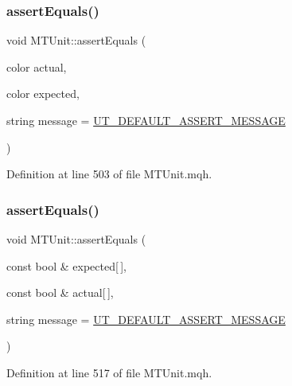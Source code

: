 \subsubsection{\texorpdfstring{assert\+Equals()}{assertEquals()}\hspace{0.1cm}{\footnotesize\ttfamily [14/28]}}
{\footnotesize\ttfamily void M\+T\+Unit\+::assert\+Equals (\begin{DoxyParamCaption}\item[{color}]{actual,  }\item[{color}]{expected,  }\item[{string}]{message = {\ttfamily \mbox{\hyperlink{_m_t_unit_8mqh_a96f5d62188d09039ebc3f443c9120e39}{U\+T\+\_\+\+D\+E\+F\+A\+U\+L\+T\+\_\+\+A\+S\+S\+E\+R\+T\+\_\+\+M\+E\+S\+S\+A\+GE}}} }\end{DoxyParamCaption})}



Definition at line 503 of file M\+T\+Unit.\+mqh.

\mbox{\label{class_m_t_unit_a9986024867ae7bd3dc91498a5adfaca5}} 
\subsubsection{\texorpdfstring{assert\+Equals()}{assertEquals()}\hspace{0.1cm}{\footnotesize\ttfamily [15/28]}}
{\footnotesize\ttfamily void M\+T\+Unit\+::assert\+Equals (\begin{DoxyParamCaption}\item[{const bool \&}]{expected\mbox{[}$\,$\mbox{]},  }\item[{const bool \&}]{actual\mbox{[}$\,$\mbox{]},  }\item[{string}]{message = {\ttfamily \mbox{\hyperlink{_m_t_unit_8mqh_a96f5d62188d09039ebc3f443c9120e39}{U\+T\+\_\+\+D\+E\+F\+A\+U\+L\+T\+\_\+\+A\+S\+S\+E\+R\+T\+\_\+\+M\+E\+S\+S\+A\+GE}}} }\end{DoxyParamCaption})}



Definition at line 517 of file M\+T\+Unit.\+mqh.

\mbox{\label{class_m_t_unit_a98b770960e7de4a307e66e9516320eb8}} 
